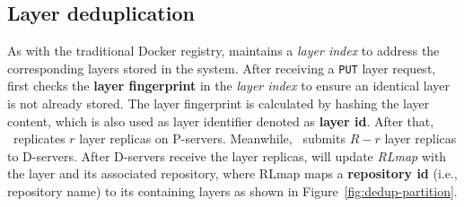 \subsection{Layer deduplication}
\label{sec:dedup-desgin}


%

%
%



As with the traditional Docker registry, 
\sysname maintains a \emph{layer index} to address the corresponding layers stored in the system.
After receiving a \texttt{PUT} layer request,
\sysname first checks the \textbf{layer fingerprint} in the \emph{layer index} to ensure 
an identical layer is not already stored.
The layer fingerprint is calculated by hashing the layer content, which is also used as layer identifier denoted as \textbf{layer id}.
After that, \sysname~replicates $r$ layer replicas on P-servers. 
Meanwhile, \sysname~submits $R-r$ layer replicas to D-servers.
 After D-servers receive the layer replicas,
 \sysname will update \emph{RLmap} with the layer and its associated repository, where
RLmap maps a \textbf{repository id} (i.e., repository name) to its containing layers 
as shown in Figure~\ref{fig:dedup-partition}.

